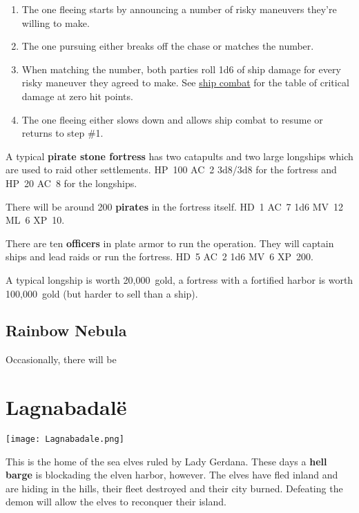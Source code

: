 \documentclass[a4paper,serif]{rpg-module}
\begin{document}
\begin{enumerate}
\item The one fleeing starts by announcing a number of risky maneuvers
  they're willing to make.
\item The one pursuing either breaks off the chase or matches the
  number.
\item When matching the number, both parties roll 1d6 of ship damage
  for every risky maneuver they agreed to make. See
  \hyperref[sec:ship-combat]{ship combat} for the table of critical
  damage at zero hit points.
\item The one fleeing either slows down and allows ship
  combat to resume or returns to step \#1.
\end{enumerate}
 
A typical \textbf{pirate stone fortress} has two catapults and two
large longships which are used to raid other settlements. HP~100 AC~2
3d8/3d8 for the fortress and HP~20 AC~8 for the longships.

There will be around 200 \textbf{pirates} in the fortress itself. HD~1
AC~7 1d6 MV~12 ML~6 XP~10.

There are ten \textbf{officers} in plate armor to run the operation.
They will captain ships and lead raids or run the fortress. HD~5 AC~2
1d6 MV~6 XP~200.

A typical longship is worth 20,000~gold, a fortress with a fortified
harbor is worth 100,000~gold (but harder to sell than a ship).

\subsection{Rainbow Nebula}
\label{sec:rainbow-nebula}

Occasionally, there will be 

\newpage

\section{Lagnabadalë}

\begin{figure*}[t]
  \centering
  \texttt{[image: Lagnabadale.png]}
\end{figure*}

This is the home of the sea elves ruled by Lady Gerdana. These days a
\textbf{hell barge} is blockading the elven harbor, however. The elves
have fled inland and are hiding in the hills, their fleet destroyed
and their city burned. Defeating the demon will allow the elves to
reconquer their island.
\end{document}
